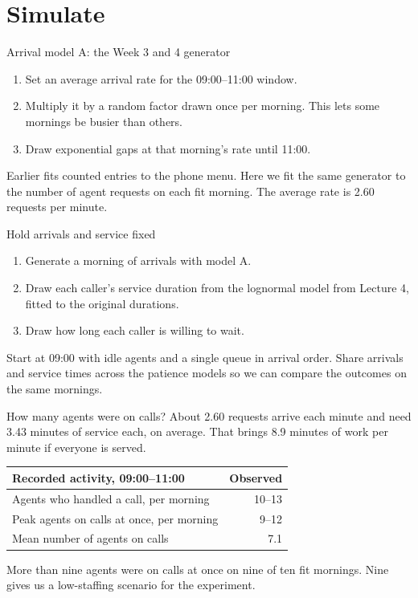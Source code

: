 \documentclass{beamer}
\begin{document}
\section{Simulate}

\begin{frame}{Arrival model A: the Week 3 and 4 generator}
  \begin{enumerate}
    \item Set an average arrival rate for the 09:00--11:00 window.
    \item Multiply it by a random factor drawn once per morning.
      This lets some mornings be busier than others.
    \item Draw exponential gaps at that morning's rate until 11:00.
  \end{enumerate}

  \vspace{0.5em}
  Earlier fits counted entries to the phone menu. Here we fit the
  same generator to the number of agent requests on each fit morning.
  The average rate is 2.60 requests per minute.
\end{frame}

\begin{frame}{Hold arrivals and service fixed}
  \begin{enumerate}
    \item Generate a morning of arrivals with model A.
    \item Draw each caller's service duration from the lognormal model
      from Lecture 4, fitted to the original durations.
    \item Draw how long each caller is willing to wait.
  \end{enumerate}

  \vspace{0.5em}
  Start at 09:00 with idle agents and a single queue in arrival order.
  Share arrivals and service times across the patience models so we
  can compare the outcomes on the same mornings.
\end{frame}

\begin{frame}{How many agents were on calls?}
  \small
  About 2.60 requests arrive each minute and need 3.43 minutes of
  service each, on average. That brings 8.9 minutes of work per minute
  if everyone is served.

  \vspace{0.6em}
  \centering
  \begin{tabular}{@{}lr@{}}
    \toprule
    Recorded activity, 09:00--11:00 & Observed\\
    \midrule
    Agents who handled a call, per morning & 10--13\\
    Peak agents on calls at once, per morning & 9--12\\
    Mean number of agents on calls & 7.1\\
    \bottomrule
  \end{tabular}

  \vspace{0.6em}
  \raggedright
  More than nine agents were on calls at once on nine of ten fit
  mornings. Nine gives us a low-staffing scenario for the experiment.
\end{frame}
\end{document}
